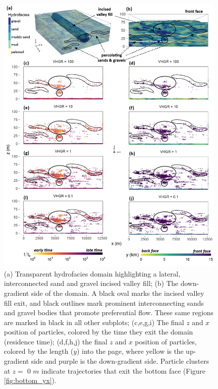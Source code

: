 \begin{figure}[H]
  \centering
  \includegraphics[width=14cm,keepaspectratio]{ch4_figs/krf_front_face_ivf_low_res-01.png}
  \caption{(a) Transparent hydrofacies domain highlighting a lateral, interconnected sand and gravel incised valley fill; (b) The down-gradient side of the domain. A black oval marks the incised valley fill exit, and black outlines mark prominent interconnecting sands and gravel bodies that promote preferential flow. These same regions are marked in black in all other subplots; (c,e,g,i) The final $z$ and $x$ position of particles, colored by the time they exit the domain (residence time); (d,f,h,j) the final $z$ and $x$ position of particles, colored by the length ($y$) into the page, where yellow is the up-gradient side and purple is the down-gradient side. Particle clusters at $z =$ 0 $m$ indicate trajectories that exit the bottom face (Figure \ref{fig:bottom_yx}).}
  \label{fig:ivf_xz}
\end{figure}



